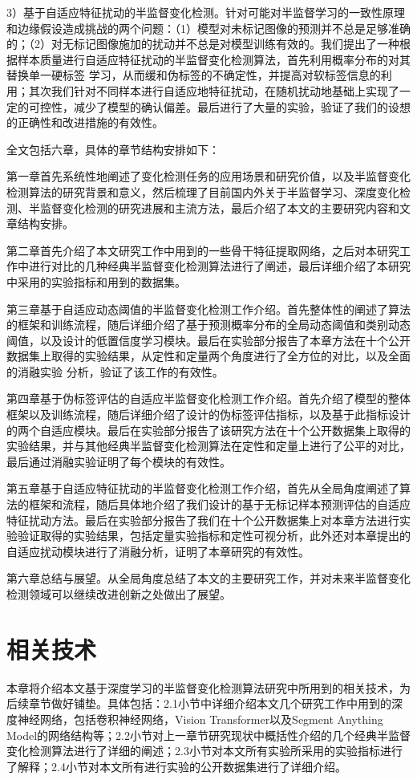 \documentclass[lang=chs, degree=master, blindreview=false, adobe=false]{yanputhesis}
\begin{document}
3）基于自适应特征扰动的半监督变化检测。针对可能对半监督学习的一致性原理和边缘假设造成挑战的两个问题：（1）模型对未标记图像的预测并不总是足够准确的；（2）对无标记图像施加的扰动并不总是对模型训练有效的。我们提出了一种根据样本质量进行自适应特征扰动的半监督变化检测算法，首先利用概率分布的对其替换单一硬标签
学习，从而缓和伪标签的不确定性，并提高对软标签信息的利用；其次我们针对不同样本进行自适应地特征扰动，在随机扰动地基础上实现了一定的可控性，减少了模型的确认偏差。最后进行了大量的实验，验证了我们的设想的正确性和改进措施的有效性。

全文包括六章，具体的章节结构安排如下：

第一章首先系统性地阐述了变化检测任务的应用场景和研究价值，以及半监督变化检测算法的研究背景和意义，然后梳理了目前国内外关于半监督学习、深度变化检测、半监督变化检测的研究进展和主流方法，最后介绍了本文的主要研究内容和文章结构安排。

第二章首先介绍了本文研究工作中用到的一些骨干特征提取网络，之后对本研究工作中进行对比的几种经典半监督变化检测算法进行了阐述，最后详细介绍了本研究中采用的实验指标和用到的数据集。

第三章基于自适应动态阈值的半监督变化检测工作介绍。首先整体性的阐述了算法的框架和训练流程，随后详细介绍了基于预测概率分布的全局动态阈值和类别动态阈值，以及设计的低置信度学习模块。最后在实验部分报告了本章方法在十个公开数据集上取得的实验结果，从定性和定量两个角度进行了全方位的对比，以及全面的消融实验
分析，验证了该工作的有效性。

第四章基于伪标签评估的自适应半监督变化检测工作介绍。首先介绍了模型的整体框架以及训练流程，随后详细介绍了设计的伪标签评估指标，以及基于此指标设计的两个自适应模块。最后在实验部分报告了该研究方法在十个公开数据集上取得的实验结果，并与其他经典半监督变化检测算法在定性和定量上进行了公平的对比，最后通过消融实验证明了每个模块的有效性。

第五章基于自适应特征扰动的半监督变化检测工作介绍，首先从全局角度阐述了算法的框架和流程，随后具体地介绍了我们设计的基于无标记样本预测评估的自适应特征扰动方法。最后在实验部分报告了我们在十个公开数据集上对本章方法进行实验验证取得的实验结果，包括定量实验指标和定性可视分析，此外还对本章提出的自适应扰动模块进行了消融分析，证明了本章研究的有效性。

第六章总结与展望。从全局角度总结了本文的主要研究工作，并对未来半监督变化检测领域可以继续改进创新之处做出了展望。
\chapter{相关技术}

本章将介绍本文基于深度学习的半监督变化检测算法研究中所用到的相关技术，为后续章节做好铺垫。具体包括：2.1小节中详细介绍本文几个研究工作中用到的深度神经网络，包括卷积神经网络，Vision Transformer以及Segment Anything Model的网络结构等；2.2小节对上一章节研究现状中概括性介绍的几个经典半监督变化检测算法进行了详细的阐述；2.3小节对本文所有实验所采用的实验指标进行了解释；2.4小节对本文所有进行实验的公开数据集进行了详细介绍。
\end{document}
